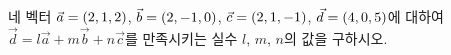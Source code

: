 네 벡터 $\vec{a}=(2{,}\mkern3mu\mathopen{}1{,}\mkern3mu\mathopen{}2)$, $\vec{b}=(2{,}\mkern3mu\mathopen{}-1{,}\mkern3mu\mathopen{}0)$, $\vec{c}=(2{,}\mkern3mu\mathopen{}1{,}\mkern3mu\mathopen{}-1)$, $\vec{d}=(4{,}\mkern3mu\mathopen{}0{,}\mkern3mu\mathopen{}5)$에 대하여 $\vec{d}=l\vec{a}+m\vec{b}+n\vec{c}$를 만족시키는 실수 $l$, $m$, $n$의 값을 구하시오.
